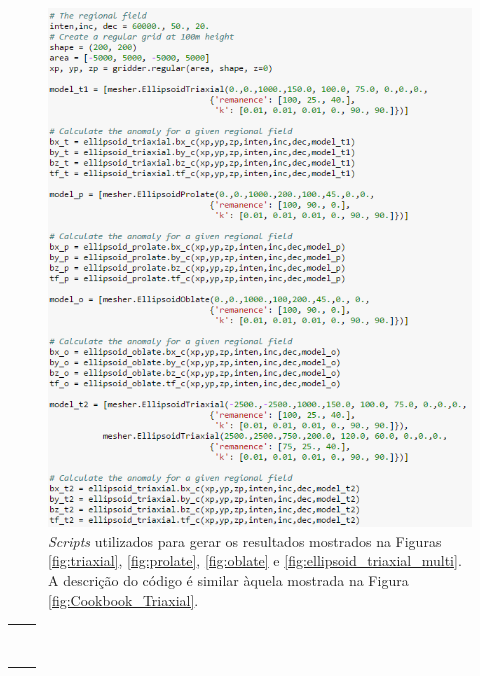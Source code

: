 \begin{figure}[hbt!]
	\centering \includegraphics[width=16 cm,height=20 cm]{figures/mag_fields_0}
	\caption[As componentes do campo magnético gerado por dois corpos triaxiais e a anomalia de campo total aproximada.]{\textit{Scripts} utilizados para gerar os resultados mostrados na Figuras \ref{fig:triaxial}, \ref{fig:prolate}, \ref{fig:oblate} e \ref{fig:ellipsoid_triaxial_multi}. A descrição do código é similar àquela mostrada na Figura \ref{fig:Cookbook_Triaxial}.}
	\label{fig:mag_fields_0}
\end{figure}

\begin{table}[h!]
	\begin{center}
		\begin{tabular}{lc}
			
			&  \\
			& \\
			& \\
			& \\
			& \\
			& \\ 
			& \\
			& \\
		\end{tabular}
	\end{center}
\end{table}

